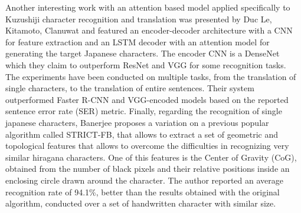 Another interesting work with an attention based model applied specifically to Kuzushiji character recognition and translation was presented by Duc Le, Kitamoto, Clanuwat and featured an encoder-decoder architecture with a CNN for feature extraction and an LSTM decoder with an attention model for generating the target Japanese characters. The encoder CNN is a DenseNet which they claim to outperform ResNet and VGG for some recognition tasks. The experiments have been conducted on multiple tasks, from the translation of single characters, to the translation of entire sentences. Their system outperformed Faster R-CNN and VGG-encoded models based on the reported sentence error rate (SER) metric.
Finally, regarding the recognition of single japanese characters, Banerjee proposes a variation on a previous popular algorithm called STRICT-FB, that allows to extract a set of geometric and topological features that allows to overcome the difficulties in recognizing very similar hiragana characters. One of this features is the Center of Gravity (CoG), obtained from the number of black pixels and their relative positions inside an enclosing circle drawn around the character. The author reported an average recognition rate of 94.1\%, better than the results obtained with the original algorithm, conducted over a set of handwritten character with similar size.
